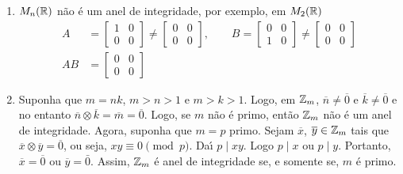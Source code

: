 \documentclass{beamer}
\begin{document}
    \begin{frame}
        \begin{exemplos}
            \begin{enumerate}[label={\arabic*})]
                \conti

                \item $M_{n}(\mathbb{R})$ n{\~a}o {\'e} um anel de integridade, por exemplo, em $M_{2}(\mathbb{R})$
                \begin{align*}
                    A &= \begin{bmatrix}
                        1 & 0\\
                        0 & 0
                    \end{bmatrix} \neq \begin{bmatrix}
                        0 & 0\\
                        0 & 0       
                    \end{bmatrix},\qquad 
                    B = \begin{bmatrix}
                        0 & 0\\
                        1 & 0
                    \end{bmatrix} \neq \begin{bmatrix}
                        0 & 0\\
                        0 & 0
                    \end{bmatrix}\\
                    AB & =\begin{bmatrix}
                        0 & 0\\
                        0 & 0
                    \end{bmatrix}
                \end{align*}

                \vspace{.5cm}
                
                \item Suponha que $m = nk$, $m > n > 1$ e $m > k > 1$. Logo, em $\mathbb{Z}_m$, $\overline{n} \neq \overline{0}$ e $\overline{k} \neq \overline{0}$ e no entanto $\overline{n} \otimes \overline{k} = \overline{m} = \overline{0}$. Logo, se $m$ n{\~a}o {\'e} primo, ent{\~a}o $\mathbb{Z}_m$ n{\~a}o {\'e} um anel de integridade. Agora, suponha que $m = p$ primo. Sejam $\overline{x}$, $\overline{y} \in \mathbb{Z}_m$ tais que $\overline{x}\otimes \overline{y} = \overline{0}$, ou seja, $xy \equiv 0 \pmod p$. Da{\'\i} $p\mid xy$. Logo $p\mid x$ ou $p\mid y$. Portanto, $\overline{x} = \overline{0}$ ou $\overline{y} = \bar{0}$. Assim, $\mathbb{Z}_m$ {\'e} anel de integridade se, e somente se, $m$ {\'e} primo.
            \end{enumerate}
        \end{exemplos}
    \end{frame}
    
\end{document}
